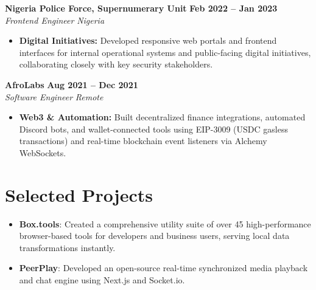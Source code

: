 \documentclass[10pt,a4paper]{article}
\newcommand{\jobheader}[4]{%
  \noindent%
  \textbf{\large #1} \hfill \textcolor{secondary}{\textbf{#2}} \\%
  \textit{\textcolor{accent}{#3}} \hfill \textit{\small\textcolor{secondary}{#4}}%
  \vspace{3pt}%
}
\begin{document}
\jobheader{Nigeria Police Force, Supernumerary Unit}{Feb 2022 -- Jan 2023}{Frontend Engineer}{Nigeria}
\begin{itemize}
  \item \textbf{Digital Initiatives:} Developed responsive web portals and frontend interfaces for internal operational systems and public-facing digital initiatives, collaborating closely with key security stakeholders.
\end{itemize}

\jobheader{AfroLabs}{Aug 2021 -- Dec 2021}{Software Engineer}{Remote}
\begin{itemize}
  \item \textbf{Web3 \& Automation:} Built decentralized finance integrations, automated Discord bots, and wallet-connected tools using EIP-3009 (USDC gasless transactions) and real-time blockchain event listeners via Alchemy WebSockets.
\end{itemize}

\section{Selected Projects}
\begin{itemize}
  \item \textbf{Box.tools}: Created a comprehensive utility suite of over 45 high-performance browser-based tools for developers and business users, serving local data transformations instantly.
  \item \textbf{PeerPlay}: Developed an open-source real-time synchronized media playback and chat engine using Next.js and Socket.io.
\end{itemize}

\end{document}
